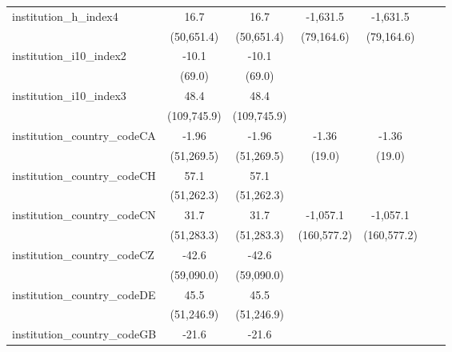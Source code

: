 \begin{tabular}{lcccccc}
   institution\_h\_index4                & 16.7        & 16.7        & -1,631.5    & -1,631.5    &       &   \\   
                                         & (50,651.4)  & (50,651.4)  & (79,164.6)  & (79,164.6)  &       &   \\   
   institution\_i10\_index2              & -10.1       & -10.1       &             &             &       &   \\   
                                         & (69.0)      & (69.0)      &             &             &       &   \\   
   institution\_i10\_index3              & 48.4        & 48.4        &             &             &       &   \\   
                                         & (109,745.9) & (109,745.9) &             &             &       &   \\   
   institution\_country\_codeCA          & -1.96       & -1.96       & -1.36       & -1.36       &       &   \\   
                                         & (51,269.5)  & (51,269.5)  & (19.0)      & (19.0)      &       &   \\   
   institution\_country\_codeCH          & 57.1        & 57.1        &             &             &       &   \\   
                                         & (51,262.3)  & (51,262.3)  &             &             &       &   \\   
   institution\_country\_codeCN          & 31.7        & 31.7        & -1,057.1    & -1,057.1    &       &   \\   
                                         & (51,283.3)  & (51,283.3)  & (160,577.2) & (160,577.2) &       &   \\   
   institution\_country\_codeCZ          & -42.6       & -42.6       &             &             &       &   \\   
                                         & (59,090.0)  & (59,090.0)  &             &             &       &   \\   
   institution\_country\_codeDE          & 45.5        & 45.5        &             &             &       &   \\   
                                         & (51,246.9)  & (51,246.9)  &             &             &       &   \\   
   institution\_country\_codeGB          & -21.6       & -21.6       &             &             &       &   \\   

\end{tabular}
